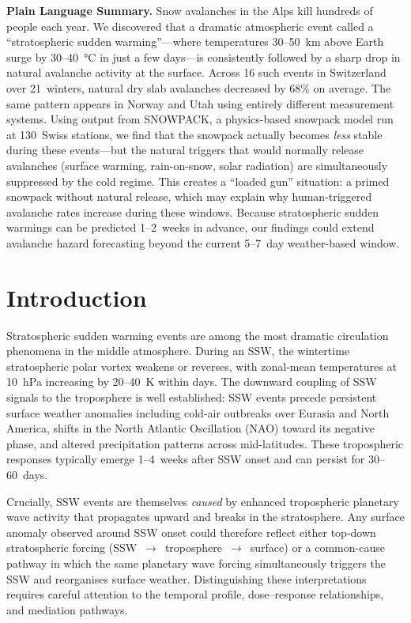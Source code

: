 \documentclass[11pt,letterpaper]{article}
\begin{document}
\noindent\textbf{Plain Language Summary.}
Snow avalanches in the Alps kill hundreds of people each year. We discovered that a dramatic atmospheric event called a ``stratospheric sudden warming''---where temperatures 30--50~km above Earth surge by 30--40~°C in just a few days---is consistently followed by a sharp drop in natural avalanche activity at the surface. Across 16 such events in Switzerland over 21~winters, natural dry slab avalanches decreased by 68\% on average. The same pattern appears in Norway and Utah using entirely different measurement systems. Using output from SNOWPACK, a physics-based snowpack model run at 130~Swiss stations, we find that the snowpack actually becomes \emph{less} stable during these events---but the natural triggers that would normally release avalanches (surface warming, rain-on-snow, solar radiation) are simultaneously suppressed by the cold regime. This creates a ``loaded gun'' situation: a primed snowpack without natural release, which may explain why human-triggered avalanche rates increase during these windows. Because stratospheric sudden warmings can be predicted 1--2~weeks in advance, our findings could extend avalanche hazard forecasting beyond the current 5--7~day weather-based window.

\section*{Introduction}

Stratospheric sudden warming events are among the most dramatic circulation phenomena in the middle atmosphere. During an SSW, the wintertime stratospheric polar vortex weakens or reverses, with zonal-mean temperatures at 10~hPa increasing by 20--40~K within days\cite{Matsuno1971,Charlton2007}. The downward coupling of SSW signals to the troposphere is well established: SSW events precede persistent surface weather anomalies including cold-air outbreaks over Eurasia and North America, shifts in the North Atlantic Oscillation (NAO) toward its negative phase, and altered precipitation patterns across mid-latitudes\cite{Baldwin2001,Thompson2002,Kidston2015}. These tropospheric responses typically emerge 1--4~weeks after SSW onset and can persist for 30--60~days\cite{Sigmond2013}.

Crucially, SSW events are themselves \emph{caused} by enhanced tropospheric planetary wave activity that propagates upward and breaks in the stratosphere\cite{Matsuno1971,Polvani2004}. Any surface anomaly observed around SSW onset could therefore reflect either top-down stratospheric forcing (SSW~$\to$~troposphere~$\to$~surface) or a common-cause pathway in which the same planetary wave forcing simultaneously triggers the SSW and reorganises surface weather. Distinguishing these interpretations requires careful attention to the temporal profile, dose--response relationships, and mediation pathways.
\end{document}
